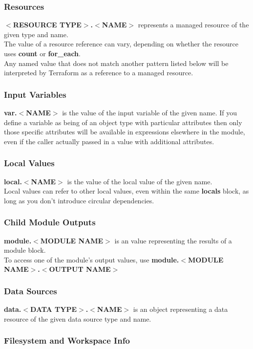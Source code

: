 \documentclass[12pt, letterpaper, twoside]{article}
\begin{document}
\subsubsection{Resources}
\textbf{$<$RESOURCE TYPE$>$.$<$NAME$>$} represents a managed resource of the given type and name.\\
The value of a resource reference can vary, depending on whether the resource uses \textbf{count} or 
\textbf{for\_each}.\\

Any named value that does not match another pattern listed below will be interpreted by Terraform 
as a reference to a managed resource.

\subsubsection{Input Variables}
\textbf{var.$<$NAME$>$} is the value of the input variable of the given name.
If you define a variable as being of an object type with particular attributes then only those 
specific attributes will be available in expressions elsewhere in the module, even if the caller actually 
passed in a value with additional attributes.

\subsubsection{Local Values}
\textbf{local.$<$NAME$>$} is the value of the local value of the given name.\\
Local values can refer to other local values, even within the same \textbf{locals} block, 
as long as you don't introduce circular dependencies.

\subsubsection{Child Module Outputs}
\textbf{module.$<$MODULE NAME$>$} is an value representing the results of a module block.\\
To access one of the module's output values, use \textbf{module.$<$MODULE NAME$>$.$<$OUTPUT NAME$>$}

\subsubsection{Data Sources}
\textbf{data.$<$DATA TYPE$>$.$<$NAME$>$} is an object representing a data resource of the given data source type
and name.

\subsubsection{Filesystem and Workspace Info}
\end{document}
